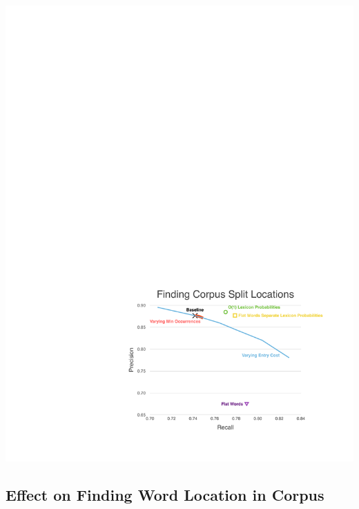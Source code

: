 \documentclass[11pt, oneside, fleqn]{article}
\begin{document}
  \includegraphics[scale=0.9]{./figure/finding_corpus_split_location.pdf}

  \subsection{Effect on Finding Word Location in Corpus}
\end{document}
